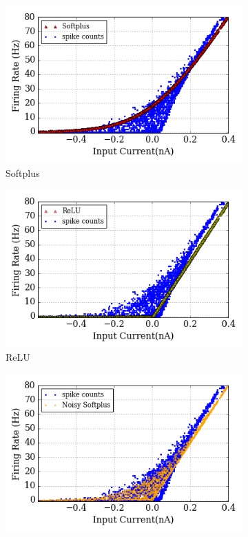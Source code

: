 \documentclass{article}
\begin{document}
\begin{figure}[hb!]
	\centering
	\begin{subfigure}[hb]{0.32\textwidth}
		\includegraphics[width=\textwidth]{pics_iconip/6-5-1.png}
		\caption{Softplus}
	\end{subfigure}
	\begin{subfigure}[hb]{0.32\textwidth}
		\includegraphics[width=\textwidth]{pics_iconip/6-5-2.png}
		\caption{ReLU}
	\end{subfigure}
	\begin{subfigure}[hb]{0.32\textwidth}
		\includegraphics[width=\textwidth]{pics_iconip/6-5-3.png}

\end{subfigure}
\end{figure}
\end{document}
